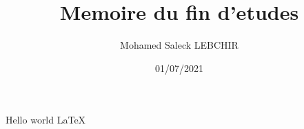 \documentclass[12pt,a4paper]{report}
\title{Memoire du fin d'etudes}
\author{Mohamed Saleck LEBCHIR}
\date{01/07/2021}
\begin{document}
Hello world \LaTeX
\end{document}
